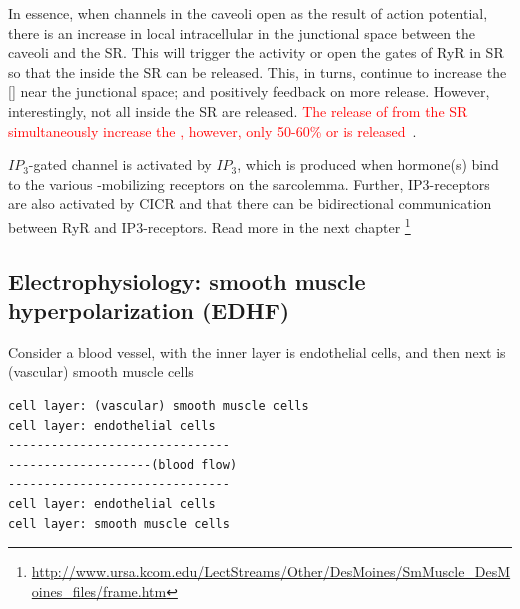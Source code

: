 In essence, when  channels in the caveoli open as the result
of action potential, there is an increase in local intracellular
\ce{[Ca^2+]} in the junctional space between the caveoli and the
SR. This will trigger the activity or open the gates of RyR in SR so
that the  inside the SR can be released. This, in turns,
continue to increase the [] near the junctional space; and
positively feedback on more  release. However,
interestingly, not all  inside the SR are released.
\textcolor{red}{The release of  from the SR simultaneously
  increase the \ce{[Ca^2+]}, however, only 50-60\% or  is
  released}~\cite{bassani1995fsr}.

$IP_3$-gated  channel is activated by $IP_3$, which is
produced when hormone(s) bind to the various -mobilizing
receptors on the sarcolemma. Further, IP3-receptors are also activated
by CICR and that there can be bidirectional communication between RyR
and IP3-receptors. Read more in the next chapter
\footnote{\url{http://www.ursa.kcom.edu/LectStreams/Other/DesMoines/SmMuscle_DesMoines_files/frame.htm}}







\subsection{Electrophysiology: smooth muscle hyperpolarization (EDHF)}
\label{sec:EDHF}

Consider a blood vessel, with the inner layer is endothelial cells, and then
next is (vascular) smooth muscle cells
\begin{verbatim}
cell layer: (vascular) smooth muscle cells
cell layer: endothelial cells
-------------------------------
--------------------(blood flow)
-------------------------------
cell layer: endothelial cells
cell layer: smooth muscle cells
\end{verbatim}


